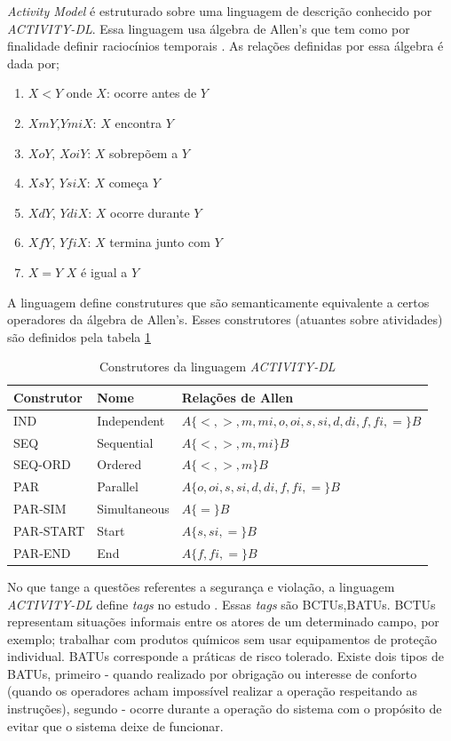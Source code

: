 \documentclass[12pt]{article}
\begin{document}
\textit{Activity Model} é estruturado sobre uma linguagem de descrição conhecido por \textit{ACTIVITY-DL}. Essa linguagem usa álgebra de Allen's que tem como por finalidade definir raciocínios temporais \cite{Allen}. As relações definidas por essa álgebra é dada por; 
\begin{enumerate}
	\item $X < Y$ onde $X$: ocorre antes de $Y$ 
	\item $X m Y$,$Y mi X$: $X$ encontra $Y$
	\item $X o Y$, $X oi Y$: $X$ sobrepõem a $Y$
	\item $X s Y$, $Y si X$: $X$ começa $Y$
	\item $X d Y$, $Y di X$: $X$ ocorre durante $Y$	  
	\item $X f Y$, $Y fi X$: $X$ termina junto com $Y$	  	
	\item $X = Y$ $X$ é igual a $Y$	  		
\end{enumerate}

A linguagem define construtures que são semanticamente equivalente a certos operadores da álgebra de Allen's. Esses construtores (atuantes sobre atividades) são definidos pela tabela \ref{acticonstruct}

\begin{table}[H]
\centering
\begin{tabular}{|l|l|l|}
\hline
Construtor & Nome         & Relações de Allen \\ \hline
IND        & Independent  & $A\{<,>,m,mi,o,oi,s,si,d,di,f,fi,=\}B$\\ \hline
SEQ        & Sequential   & $A\{<,>,m,mi\}B$\\ \hline
SEQ-ORD    & Ordered      & $A\{<,>,m\}B$\\ \hline
PAR        & Parallel     & $A\{o,oi,s,si,d,di,f,fi,=\}B$ \\ \hline
PAR-SIM    & Simultaneous & $A\{=\}B$\\ \hline
PAR-START  & Start        & $A\{s,si,=\}B$\\ \hline
PAR-END    & End          & $A\{f,fi,=\}B$ \\ \hline
\end{tabular}
\caption{Construtores da linguagem \textit{ACTIVITY-DL} \cite{violationcamille}}
\label{acticonstruct}
\end{table}

No que tange a questões referentes a segurança e violação, a linguagem \textit{ACTIVITY-DL} define \textit{tags} no estudo \cite{FADIER2003759}. Essas \textit{tags} são BCTUs,BATUs. BCTUs representam situações informais entre os atores de um determinado campo, por exemplo; trabalhar com produtos químicos sem usar equipamentos de proteção individual. BATUs corresponde a práticas de risco tolerado. Existe dois tipos de BATUs, primeiro - quando realizado por obrigação ou interesse de conforto (quando os operadores acham impossível realizar a operação respeitando as instruções), segundo - ocorre durante a operação do sistema com o propósito de evitar que o sistema deixe de funcionar.    
\end{document}
